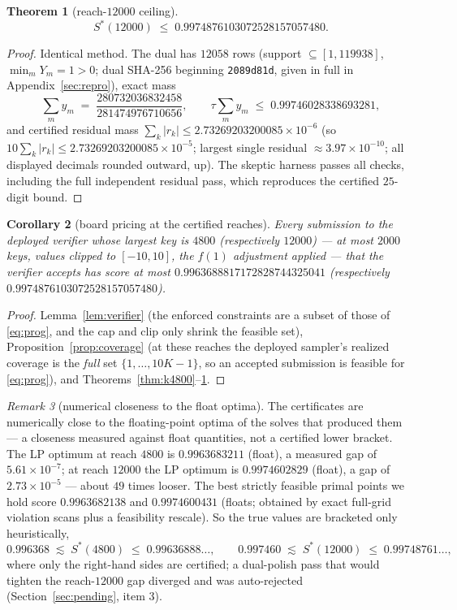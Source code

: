 \documentclass[11pt]{article}
\newtheorem{theorem}{Theorem}
\newtheorem{corollary}[theorem]{Corollary}
\theoremstyle{remark}
\newtheorem{remark}[theorem]{Remark}
\newcommand{\Sstar}{S^{*}}
\begin{document}
\begin{theorem}[reach-$12000$ ceiling]\label{thm:k12000}
\[
\Sstar(12000) \;\le\; 0.9974876103072528157057480 .
\]
\end{theorem}

\begin{proof}
Identical method. The dual has $12058$ rows (support
$\subseteq [1, 119938]$, $\min_m Y_m = 1 > 0$; dual SHA-256 beginning
\texttt{2089d81d}, given in full in Appendix~\ref{sec:repro}), exact mass
\[
\sum_m y_m \;=\; \frac{280732036832458}{281474976710656},
\qquad
\tau \sum_m y_m \;\le\; 0.99746028338693281,
\]
and certified residual mass $\sum_k |r_k| \le
2.73269203200085\times10^{-6}$ (so $10\sum_k|r_k| \le
2.73269203200085\times10^{-5}$; largest single residual
$\approx 3.97\times10^{-10}$; all displayed decimals rounded outward, up).
The skeptic harness passes all checks,
including the full independent residual pass, which reproduces the
certified $25$-digit bound.
\end{proof}

\begin{corollary}[board pricing at the certified reaches]\label{cor:board}
\sloppy
Every submission to the deployed verifier whose largest key is $4800$
(respectively $12000$) --- at most $2000$ keys, values clipped to
$[-10,10]$, the $f(1)$ adjustment applied --- that the verifier accepts
has score at most $0.9963688817172828744325041$ (respectively
$0.9974876103072528157057480$).
\end{corollary}

\begin{proof}
Lemma~\ref{lem:verifier} (the enforced constraints are a subset of those
of \eqref{eq:prog}, and the cap and clip only shrink the feasible set),
Proposition~\ref{prop:coverage} (at these reaches the deployed sampler's
realized coverage is the \emph{full} set $\{1,\dots,10K-1\}$, so an
accepted submission is feasible for \eqref{eq:prog}), and
Theorems~\ref{thm:k4800}--\ref{thm:k12000}.
\end{proof}

\begin{remark}[numerical closeness to the float optima]\label{rem:gaps}
The certificates are numerically close to the floating-point optima of the
solves that produced them --- a closeness measured against float quantities,
not a certified lower bracket. The LP
optimum at reach $4800$ is $0.9963683211$ (float), a measured gap of
$5.61\times10^{-7}$; at reach $12000$ the LP optimum is $0.9974602829$
(float), a gap of $2.73\times10^{-5}$ --- about $49$ times looser. The
best strictly feasible primal points we hold score $0.9963682138$ and
$0.9974600431$ (floats; obtained by exact full-grid violation scans plus a
feasibility rescale). So the true values are bracketed only heuristically,
\[
0.996368 \;\lesssim\; \Sstar(4800) \;\le\; 0.99636888\ldots, \qquad
0.997460 \;\lesssim\; \Sstar(12000) \;\le\; 0.99748761\ldots,
\]
where only the right-hand sides are certified; a dual-polish pass that
would tighten the reach-$12000$ gap diverged and was auto-rejected
(Section~\ref{sec:pending}, item 3).
\end{remark}
\end{document}
